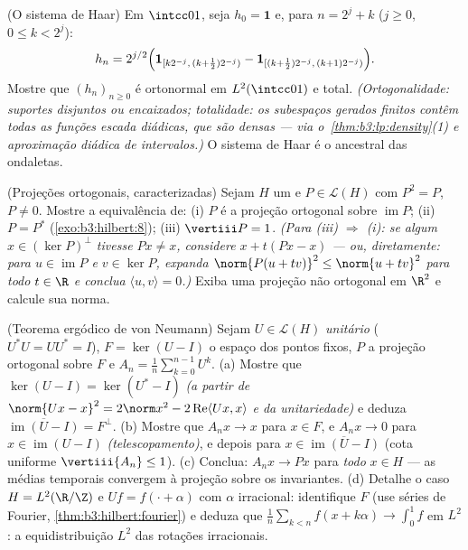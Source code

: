 \begin{exercise}[$\star\star\star$]\label{exo:b3:hilbert:10}
(O sistema de Haar) Em $\intcc01$, seja $h_{0} = \mathbf 1$ e, para $n = 2^j + k$ ($j \geq 0$, $0 \leq k < 2^j$):
\[
h_n = 2^{j/2}\Bigl(\mathbf 1_{[k2^{-j},\,(k +
\frac12)2^{-j})} - \mathbf 1_{[(k+\frac12)2^{-j},\,(k+1)2^{-j})}
\Bigr).
\]
Mostre que $(h_n)_{n\geq0}$ é ortonormal em $L^2(\intcc01)$ e total. \emph{(Ortogonalidade:
suportes disjuntos ou encaixados; totalidade: os subespaços gerados
finitos contêm todas as funções escada diádicas, que são densas --- via
o~\cref{thm:b3:lp:density}(1) e aproximação diádica de intervalos.)} O sistema de
Haar é o ancestral das ondaletas.
\end{exercise}

\begin{exercise}[$\star\star$]\label{exo:b3:hilbert:11}
(Projeções ortogonais, caracterizadas) Sejam $H$ um  e $P \in \mathcal L(H)$ com $P^2 = P$, $P \neq 0$. Mostre a equivalência de:
(i) $P$ é a projeção ortogonal sobre $\operatorname{im}P$;
(ii) $P = P^*$ (\cref{exo:b3:hilbert:8});
(iii) $\vertiii P = 1$.
\emph{(Para (iii) $\Rightarrow$ (i): se algum $x \in
(\ker P)^\perp$ tivesse $Px \neq x$, considere
$x + t(Px - x)$ --- ou, diretamente: para $u \in \operatorname{im}P$ e $v \in
\ker P$, expanda $\norm{P(u + tv)}^2 \leq \norm{u + tv}^2$ para todo
$t \in \R$ e conclua $\langle u, v\rangle = 0$.)}
Exiba uma projeção não ortogonal em $\R^2$ e calcule sua norma.
\end{exercise}

\begin{exercise}[$\star\star\star$]\label{exo:b3:hilbert:12}
(Teorema ergódico de von Neumann) Sejam $U \in \mathcal L(H)$ \emph{unitário} ($U^*U = UU^* = I$),
$F = \ker(U - I)$ o espaço dos pontos fixos, $P$ a projeção ortogonal sobre
$F$ e $A_n = \frac1n\sum_{k=0}^{n-1}U^k$.
(a) Mostre que $\ker(U - I) = \ker(U^* - I)$ \emph{(a partir de $\norm{Ux - x}^2 = 2\norm x^2 - 2\operatorname{Re}\langle
Ux, x\rangle$ e da unitariedade)} e
deduza $\overline{\operatorname{im}(U - I)} = F^\perp$.
(b) Mostre que $A_nx \to x$ para $x \in F$, e $A_nx \to 0$ para $x \in \operatorname{im}(U - I)$
\emph{(telescopamento)}, e depois para $x \in \overline{\operatorname{im}(U - I)}$ (cota uniforme $\vertiii{A_n} \leq 1$).
(c) Conclua: $A_nx \to Px$ para \emph{todo} $x \in H$ --- as médias temporais
convergem à projeção sobre os invariantes.
(d) Detalhe o caso $H = L^2(\R/\Z)$ e $Uf = f(\cdot +
\alpha)$ com $\alpha$ irracional: identifique
$F$ (use séries de Fourier, \cref{thm:b3:hilbert:fourier}) e deduza que $\frac1n\sum_{k<n}f(x + k\alpha) \to \int_0^1f$ em
$L^2$: a equidistribuição $L^2$ das rotações irracionais.
\end{exercise}

